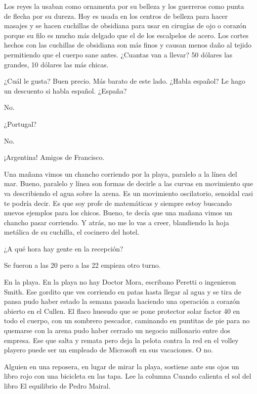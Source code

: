 \documentclass[11pt,twoside,openright,a6paper]{book}
\begin{document}
Los reyes la usaban como ornamenta por su belleza y los guerreros como punta de flecha por su dureza. Hoy es usada en los centros de belleza para hacer masajes y se hacen cuchillas de obsidiana para usar en cirugías de ojo o corazón porque su filo es mucho más delgado que el de los escalpelos de acero. Los cortes hechos con las cuchillas de obsidiana son más finos y causan menos daño al tejido permitiendo que el cuerpo sane antes. ¿Cuantas van a llevar? 50 dólares las grandes, 10 dólares las más chicas.


\vspace{1.5cm}
¿Cuál le gusta? Buen precio. Más barato de este lado. ¿Habla español? Le hago un descuento si habla español. ¿España?

No.

¿Portugal?

No.

¡Argentina! Amigos de Francisco.


\vspace{1.5cm}
Una mañana vimos un chancho corriendo por la playa, paralelo a la línea del mar. Bueno, paralelo y línea son formas de decirle a las curvas en movimiento que va describiendo el agua sobre la arena. Es un movimiento oscilatorio, senoidal casi te podría decir. Es que soy profe de matemáticas y siempre estoy buscando nuevos ejemplos para los chicos. Bueno, te decía que una mañana vimos un chancho pasar corriendo. Y atrás, no me lo vas a creer, blandiendo la hoja metálica de su cuchilla, el cocinero del hotel.


\vspace{1.5cm}
¿A qué hora hay gente en la recepción?

Se fueron a las 20 pero a las 22 empieza otro turno.


\vspace{1.5cm}
En la playa. En la playa no hay Doctor Mora, escribano Peretti o ingenieron Smith. Ese gordito que ves corriendo en patas hasta llegar al agua y se tira de pansa pudo haber estado la semana pasada haciendo una operación a corazón abierto en el Cullen. El flaco huesudo que se pone protector solar factor 40 en todo el cuerpo, con un sombrero pescador, caminando en puntitas de pie para no quemarse con la arena pudo haber cerrado un negocio millonario entre dos empresa. Ese que salta y remata pero deja la pelota contra la red en el volley playero puede ser un empleado de Microsoft en sus vacaciones. O no.

Alguien en una reposera, en lugar de mirar la playa, sostiene ante sus ojos un libro rojo con una bicicleta en las tapa. Lee la columna Cuando calienta el sol del libro El equilibrio de Pedro Mairal.
\end{document}
